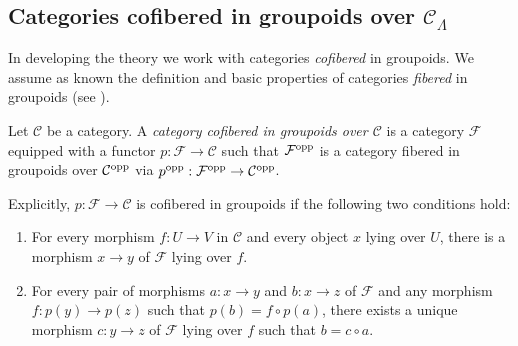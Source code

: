 \subsection{Categories cofibered in groupoids over $\mathcal C_{\Lambda}$}
\label{subsection-cofibered-groupoids}
In developing the theory we work with categories \emph{cofibered} in groupoids. 
 We assume as known the definition and basic properties of categories 
\emph{fibered} in groupoids (see \cite[Section 4.30]{stacks-project}).

\begin{definition}
Let $\mathcal C$ be a category.  A \emph{category cofibered in groupoids over 
$\mathcal C$} is a category $\mathcal F$ equipped with a functor $p: \mathcal F 
\rightarrow \mathcal C$ such that $\mathcal F^{\textnormal{opp}}$ is a category 
fibered in groupoids over $\mathcal C^{\textnormal{opp}}$ via 
$p^{\textnormal{opp}}: \mathcal F^{\textnormal{opp}} \rightarrow \mathcal 
C^{\textnormal{opp}}$.
\end{definition}

\noindent
Explicitly, $p: \mathcal F \rightarrow \mathcal C$ is cofibered in groupoids if 
the following two conditions hold:
\begin{enumerate}
\item For every morphism $f: U \rightarrow V$ in $\mathcal C$ and every object 
$x$ lying over $U$, there is a morphism $x \rightarrow y$ of $\mathcal F$ lying 
over $f$.

\item For every pair of morphisms $a: x \rightarrow y$ and $b: x \rightarrow z$ 
of $\mathcal F$ and any morphism $f: p(y) \rightarrow p(z)$ such that $p(b) = f 
\circ p(a)$, there exists a unique morphism $c: y \rightarrow z$ of $\mathcal 
F$ lying over $f$ such that $b = c \circ a$.
\end{enumerate}

